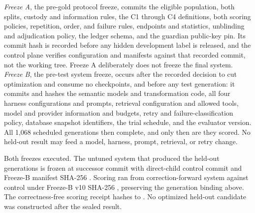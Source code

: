 \emph{Freeze A}, the pre-gold protocol freeze, commits the eligible population,
both splits, custody and information rules, the C1 through C4 definitions, both
scoring policies, repetition, order, and failure rules, endpoints and statistics,
unblinding and adjudication policy, the ledger schema, and the guardian
public-key pin. Its commit hash is recorded before any hidden development label
is released, and the control plane verifies configuration and manifests against
that recorded commit, not the working tree. Freeze A deliberately does not
freeze the final system. \emph{Freeze B}, the pre-test system freeze, occurs
after the recorded decision to cut optimization and consume no checkpoints, and before any
test generation: it commits and hashes the semantic models and transformation
code, all four harness configurations and prompts, retrieval configuration and
allowed tools, model and provider information and budgets, retry and
failure-classification policy, database snapshot identifiers, the trial schedule,
and the evaluator version. All 1,068 scheduled generations then complete, and
only then are they scored. No held-out result may feed a model, harness, prompt,
retrieval, or retry change.

Both freezes executed. The untuned system that produced the held-out generations
is frozen at successor commit
 with direct-child control commit
 and Freeze-B manifest SHA-256
. Scoring
ran from correction-forward system
 against control
 under Freeze-B v10 SHA-256
,
preserving the generation binding above. The correctness-free scoring receipt
hashes to
. No
optimized held-out candidate was constructed after the sealed result.
